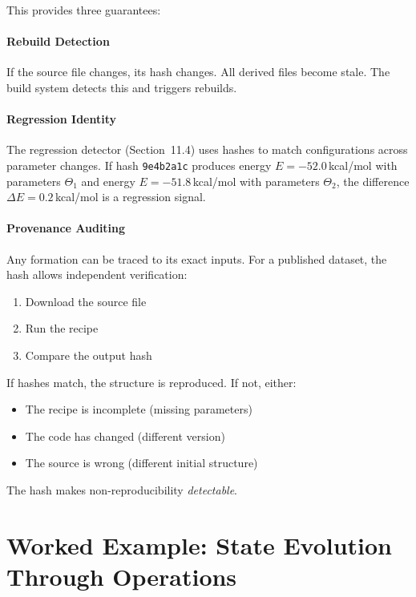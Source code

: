 \documentclass[11pt]{article}
\begin{document}
This provides three guarantees:

\paragraph{Rebuild Detection}

If the source file changes, its hash changes. All derived files become stale. The build system detects this and triggers rebuilds.

\paragraph{Regression Identity}

The regression detector (Section~11.4) uses hashes to match configurations across parameter changes. If hash \texttt{9e4b2a1c} produces energy $E = -52.0$\,kcal/mol with parameters $\Theta_1$ and energy $E = -51.8$\,kcal/mol with parameters $\Theta_2$, the difference $\Delta E = 0.2$\,kcal/mol is a regression signal.

\paragraph{Provenance Auditing}

Any formation can be traced to its exact inputs. For a published dataset, the hash allows independent verification:
\begin{enumerate}
\item Download the source file
\item Run the recipe
\item Compare the output hash
\end{enumerate}

If hashes match, the structure is reproduced. If not, either:
\begin{itemize}
\item The recipe is incomplete (missing parameters)
\item The code has changed (different version)
\item The source is wrong (different initial structure)
\end{itemize}

The hash makes non-reproducibility \textit{detectable}.

\section{Worked Example: State Evolution Through Operations}
\end{document}
